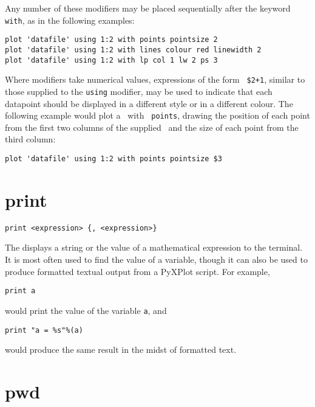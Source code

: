 Any number of these modifiers may be placed sequentially after the keyword {\tt
with}, as in the following examples:

\begin{verbatim}
plot 'datafile' using 1:2 with points pointsize 2
plot 'datafile' using 1:2 with lines colour red linewidth 2
plot 'datafile' using 1:2 with lp col 1 lw 2 ps 3
\end{verbatim}

\noindent Where modifiers take numerical values, expressions of the form {\tt
\$2+1}, similar to those supplied to the {\tt using} modifier, may be used to
indicate that each datapoint should be displayed in a different style or in a
different colour. The following example would plot a \datafile\ with {\tt
points}, drawing the position of each point from the first two columns of the
supplied \datafile\ and the size of each point from the third column:
\begin{verbatim}
plot 'datafile' using 1:2 with points pointsize $3
\end{verbatim}


\section{print}

\begin{verbatim}
print <expression> {, <expression>}
\end{verbatim}

The  displays a string or the value of a mathematical expression to the
terminal. It is most often used to find the value of a variable, though it can
also be used to produce formatted textual output from a PyXPlot script. For example,

\begin{verbatim}
print a
\end{verbatim}

\noindent would print the value of the variable {\tt a}, and

\begin{verbatim}
print "a = %s"%(a)
\end{verbatim}

\noindent would produce the same result in the midst of formatted text.


\section{pwd}

